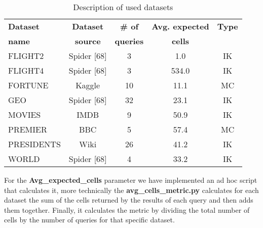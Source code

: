 \documentclass[12pt,a4paper]{article}
\begin{document}
\begin{table}[h]
\centering
\begin{tabular}{lcccc}
\toprule
\textbf{Dataset} & \textbf{Dataset} & \textbf{\# of} & \textbf{Avg. expected} & \textbf{Type} \\
\textbf{name} & \textbf{source} & \textbf{queries} & \textbf{cells} & \\
\midrule
FLIGHT2 & Spider [68] & 3 & 1.0 & IK \\
FLIGHT4 & Spider [68] & 3 & 534.0 & IK \\
FORTUNE & Kaggle & 10 & 11.1 & MC \\
GEO & Spider [68] & 32 & 23.1 & IK \\
MOVIES & IMDB & 9 & 50.9 & IK \\
PREMIER & BBC & 5 & 57.4 & MC \\
PRESIDENTS & Wiki & 26 & 41.2 & IK \\
WORLD & Spider [68] & 4 & 33.2 & IK \\


\bottomrule
\end{tabular}
\caption{Description of used datasets}
\label{tab:datasets}
\end{table}


For the \textbf{Avg\_expected\_cells} parameter we have implemented an ad hoc script that calculates it, more technically the \textbf{avg\_cells\_metric.py} calculates for each dataset the sum of the cells returned by the results of each query and then adds them together.
Finally, it calculates the metric by dividing the total number of cells by the number of queries for that specific dataset.
\end{document}

